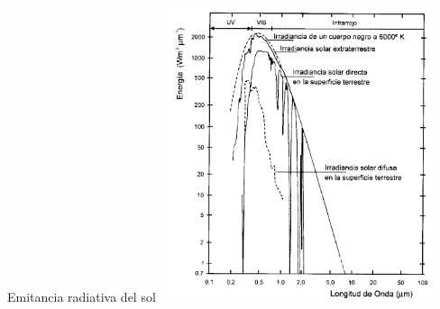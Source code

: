 \documentclass{beamer}
\begin{document}
\begin{frame}{Emitancia radiativa del sol}
	\centering
	\includegraphics[width=0.6\textwidth]{IMGs/law2}
\end{frame}
\end{document}
